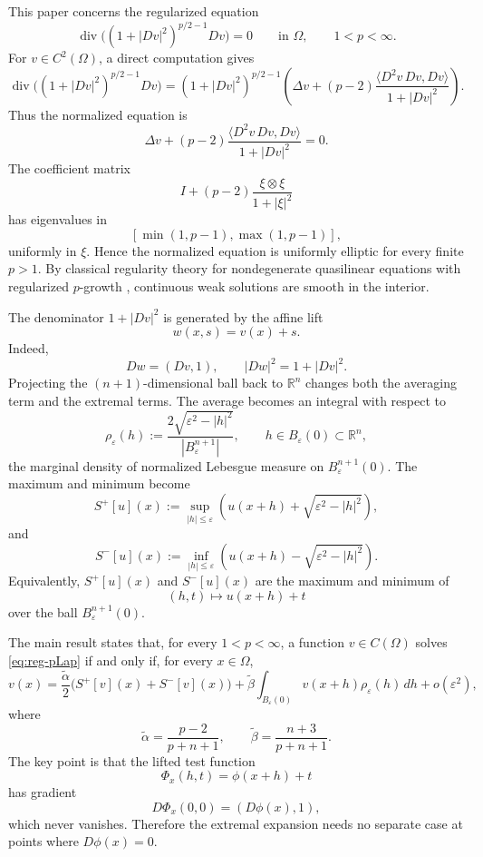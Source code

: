 \documentclass[12pt,reqno]{amsart}
\numberwithin{equation}{section}
\theoremstyle{plain}
\theoremstyle{definition}
\theoremstyle{remark}
\DeclareMathOperator{\divgg}{div}
\newcommand{\R}{\mathbb{R}}
\newcommand{\talpha}{\widetilde\alpha}
\newcommand{\tbeta}{\widetilde\beta}
\newcommand{\Sp}{S^+}
\newcommand{\Sm}{S^-}
\newcommand{\rhoeps}{\rho_\varepsilon}
\begin{document}
This paper concerns the regularized equation
\begin{equation}\label{eq:reg-pLap}
  \divgg\bigl((1+|Dv|^2)^{p/2-1}Dv\bigr)=0
  \qquad\text{in }\Omega,
  \qquad 1<p<\infty.
\end{equation}
For $v\in C^2(\Omega)$, a direct computation gives
\begin{equation}\label{eq:decomp-intro}
  \divgg\bigl((1+|Dv|^2)^{p/2-1}Dv\bigr)
  =
  (1+|Dv|^2)^{p/2-1}
  \left(
    \Delta v
    +
    (p-2)
    \frac{\langle D^2v\,Dv,Dv\rangle}{1+|Dv|^2}
  \right).
\end{equation}
Thus the normalized equation is
\[
  \Delta v
  +
  (p-2)
  \frac{\langle D^2v\,Dv,Dv\rangle}{1+|Dv|^2}
  =
  0.
\]
The coefficient matrix
\[
  I+(p-2)\frac{\xi\otimes\xi}{1+|\xi|^2}
\]
has eigenvalues in
\[
  [\min(1,p-1),\max(1,p-1)],
\]
uniformly in $\xi$. Hence the normalized equation is uniformly elliptic
for every finite $p>1$. By classical regularity theory for nondegenerate
quasilinear equations with regularized $p$-growth
\cite{Lieberman88,GilbargTrudinger}, continuous weak solutions are smooth
in the interior.

The denominator $1+|Dv|^2$ is generated by the affine lift
\[
  w(x,s)=v(x)+s.
\]
Indeed,
\[
  Dw=(Dv,1),
  \qquad
  |Dw|^2=1+|Dv|^2.
\]
Projecting the $(n+1)$-dimensional ball back to $\R^n$ changes both the
averaging term and the extremal terms. The average becomes an integral
with respect to
\[
  \rhoeps(h)
  :=
  \frac{2\sqrt{\varepsilon^2-|h|^2}}{|B_\varepsilon^{n+1}|},
  \qquad
  h\in B_\varepsilon(0)\subset\R^n,
\]
the marginal density of normalized Lebesgue measure on
$B_\varepsilon^{n+1}(0)$. The maximum and minimum become
\[
  \Sp[u](x)
  :=
  \sup_{|h|\le\varepsilon}
  \left(
    u(x+h)+\sqrt{\varepsilon^2-|h|^2}
  \right),
\]
and
\[
  \Sm[u](x)
  :=
  \inf_{|h|\le\varepsilon}
  \left(
    u(x+h)-\sqrt{\varepsilon^2-|h|^2}
  \right).
\]
Equivalently, $\Sp[u](x)$ and $\Sm[u](x)$ are the maximum and minimum of
\[
  (h,t)\longmapsto u(x+h)+t
\]
over the ball $B_\varepsilon^{n+1}(0)$.

The main result states that, for every $1<p<\infty$, a function
$v\in C(\Omega)$ solves \eqref{eq:reg-pLap} if and only if, for every
$x\in\Omega$,
\begin{equation}\label{eq:intro-amv}
  v(x)
  =
  \frac{\talpha}{2}
  \bigl(\Sp[v](x)+\Sm[v](x)\bigr)
  +
  \tbeta
  \int_{B_\varepsilon(0)}
  v(x+h)\rhoeps(h)\,dh
  +
  o(\varepsilon^2),
\end{equation}
where
\[
  \talpha=\frac{p-2}{p+n+1},
  \qquad
  \tbeta=\frac{n+3}{p+n+1}.
\]
The key point is that the lifted test function
\[
  \Phi_x(h,t)=\phi(x+h)+t
\]
has gradient
\[
  D\Phi_x(0,0)=(D\phi(x),1),
\]
which never vanishes. Therefore the extremal expansion needs no separate
case at points where $D\phi(x)=0$.
\end{document}
